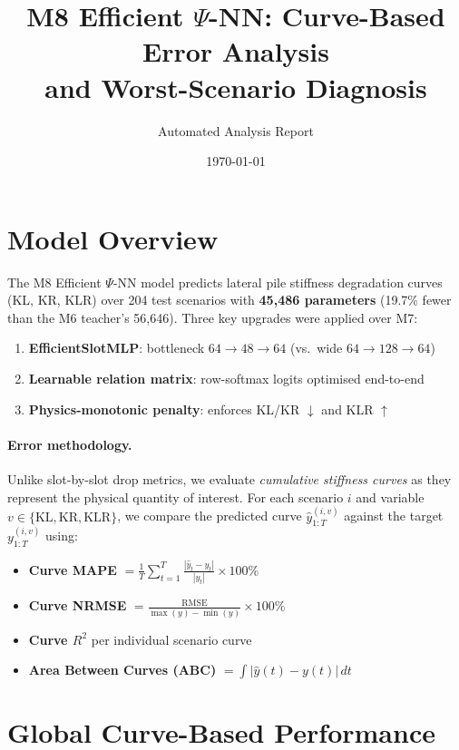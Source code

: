 \documentclass[11pt,a4paper]{article}
\title{M8 Efficient $\Psi$-NN: Curve-Based Error Analysis\\and Worst-Scenario Diagnosis}
\author{Automated Analysis Report}
\date{\today}
\begin{document}
\maketitle

\section{Model Overview}

The M8 Efficient $\Psi$-NN model predicts lateral pile stiffness degradation
curves (KL, KR, KLR) over 204 test scenarios with
\textbf{45,486 parameters} (19.7\% fewer than the M6 teacher's 56,646).
Three key upgrades were applied over M7:
\begin{enumerate}[nosep]
    \item \textbf{EfficientSlotMLP}: bottleneck $64 \to 48 \to 64$ (vs.\ wide $64 \to 128 \to 64$)
    \item \textbf{Learnable relation matrix}: row-softmax logits optimised end-to-end
    \item \textbf{Physics-monotonic penalty}: enforces KL/KR $\downarrow$ and KLR $\uparrow$
\end{enumerate}

\paragraph{Error methodology.}
Unlike slot-by-slot drop metrics, we evaluate \emph{cumulative stiffness curves}
as they represent the physical quantity of interest.  For each scenario $i$ and
variable $v \in \{\text{KL},\text{KR},\text{KLR}\}$, we compare the predicted
curve $\hat{y}^{(i,v)}_{1:T}$ against the target $y^{(i,v)}_{1:T}$ using:
\begin{itemize}[nosep]
    \item \textbf{Curve MAPE} $= \frac{1}{T}\sum_{t=1}^{T} \frac{|\hat{y}_t - y_t|}{|y_t|} \times 100\%$
    \item \textbf{Curve NRMSE} $= \frac{\text{RMSE}}{\max(y) - \min(y)} \times 100\%$
    \item \textbf{Curve $R^2$} per individual scenario curve
    \item \textbf{Area Between Curves (ABC)} $= \int |\hat{y}(t) - y(t)|\,dt$
\end{itemize}

\section{Global Curve-Based Performance}
\end{document}
